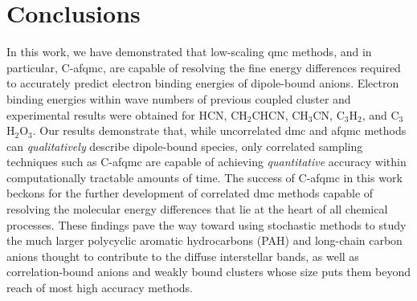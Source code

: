 \section{Conclusions}
In this work, we have demonstrated that low-scaling \gls{qmc} methods, and in particular, C-\gls{afqmc}, are capable of resolving the fine energy differences required to accurately predict electron binding energies of dipole-bound anions.
Electron binding energies within wave numbers of previous coupled cluster and experimental results were obtained for HCN, CH$_{2}$CHCN, CH$_{3}$CN, C$_{3}$H$_{2}$, and C$_{3}$H$_{2}$O$_{3}$.
Our results demonstrate that, while uncorrelated \gls{dmc} and \gls{afqmc} methods can \textit{qualitatively} describe dipole-bound species, only correlated sampling techniques such as C-\gls{afqmc} are capable of achieving \textit{quantitative} accuracy within computationally tractable amounts of time.
The success of C-\gls{afqmc} in this work beckons for the further development of correlated \gls{dmc} methods capable of resolving the molecular energy differences that lie at the heart of all chemical processes.
These findings pave the way toward using stochastic methods to study the much larger polycyclic aromatic hydrocarbons (PAH) \cite{10.1021/acs.jpclett.5b01858} and long-chain carbon anions\cite{10.1086/311637} thought to contribute to the diffuse interstellar bands, as well as correlation-bound anions\cite{10.1021/jz400195s,10.1063/1.4991497} and weakly bound clusters \cite{10.1073/pnas.1715434115} whose size puts them beyond reach of most high accuracy methods.
